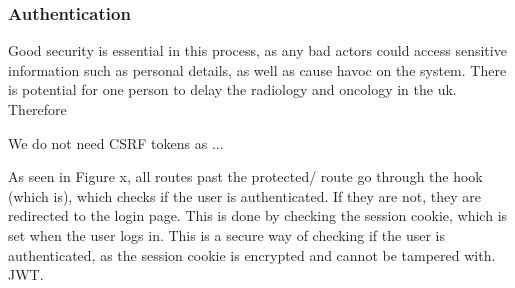 \subsubsection{Authentication}
Good security is essential in this process, as any bad actors could access sensitive information such as personal details, as well as cause havoc on the system. There is potential for one person to delay the radiology and oncology in the uk. Therefore 

We do not need CSRF tokens as ...

As seen in Figure x, all routes past the protected/ route go through the hook (which is), which checks if the user is authenticated. If they are not, they are redirected to the login page. This is done by checking the session cookie, which is set when the user logs in. This is a secure way of checking if the user is authenticated, as the session cookie is encrypted and cannot be tampered with. JWT. 

\noindent
{}